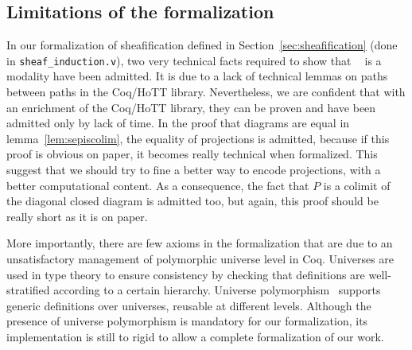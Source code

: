 \documentclass[conference]{IEEEtran}
\DeclareMathOperator{\IsHProp}{IsHProp}
\DeclareMathOperator{\id}{id}
\newcommand \separated {\mathop{\square_{n+1}} }
\begin{document}

\subsection{Limitations of the formalization}

In our formalization of sheafification defined in
Section~\ref{sec:sheafification} (done in 
\texttt{sheaf\_induction.v}), two very technical facts required to
show that $\separated$ is a modality have been
admitted. 
%
It is due to a lack of technical lemmas on paths between paths in
the Coq/HoTT library.
%
Nevertheless, we are confident that with an enrichment of the Coq/HoTT
library, they can be proven and have been admitted only by lack of
time.
%
In the proof that diagrams are equal in lemma~\ref{lem:sepiscolim},
the equality of projections is admitted, because if this proof is
obvious on paper, it becomes really technical when formalized.
%
This suggest that we should try to fine a better way to encode
projections, with a better computational content.
%
As a consequence, the fact that $P$ is a colimit of the diagonal
closed diagram is admitted too, but again, this proof should be really
short as it is on paper.

More importantly, there are few axioms in the formalization that are
due to an unsatisfactory management of polymorphic universe level in
Coq.
%
Universes are used in type theory to ensure consistency by checking
that definitions are well-stratified according to a certain hierarchy.
%
Universe polymorphism~\cite{sozeau2014universe} supports generic
definitions over universes, reusable at different levels.
%
Although the presence of universe polymorphism is mandatory for our
formalization, its implementation is still to rigid to allow a
complete formalization of our work.
\end{document}

